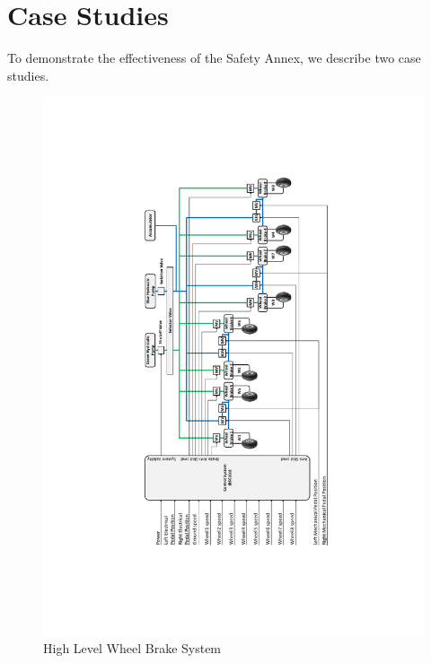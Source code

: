  \section{Case Studies}
\label{sec:case_study}
To demonstrate the effectiveness of the Safety Annex, we describe two case studies.

\begin{figure}[!ht]
	\begin{center}
		\vspace{-50pt}
		\includegraphics[trim=20 20 20 20,clip,width=1.0\textwidth]{images/wbs_large.pdf}
		\vspace{-70pt}
		\caption{High Level Wheel Brake System}
 		\label{fig:wbs1}
	\end{center}
\end{figure}

